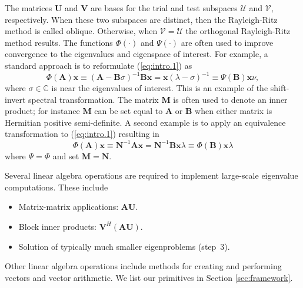 \documentclass[acmtoms]{acmtrans2m}
\begin{document}
The matrices $\mathbf{U}$ and $\mathbf{V}$ are bases for the trial
and test subspaces $\mathcal{U}$ and $\mathcal{V}$, respectively.
When these two subspaces are distinct, then the Rayleigh-Ritz method is
called oblique. Otherwise, when $\mathcal{V} = \mathcal{U}$ the
orthogonal Rayleigh-Ritz method results. The functions $\Phi(\cdot)$
and $\Psi(\cdot)$ are often used to improve convergence to the
eigenvalues and eigenspace of interest. For example, a standard
approach is to reformulate (\ref{eq:intro.1}) as
$$
  \Phi(\mathbf{A}) \mathbf{x} \equiv
  (\mathbf{A}- \mathbf{B}\sigma)^{-1}\mathbf{B}\mathbf{x} =  \mathbf{x}
  (\lambda-\sigma)^{-1} \equiv \Psi(\mathbf{B})\mathbf{x} \nu ,
$$
where $\sigma \in \mathbb{C}$ is near the eigenvalues of interest.
This is an example of the shift-invert spectral transformation. The
matrix $\mathbf{M}$ is often used to denote an inner product; for
instance $\mathbf{M}$ can be set equal to $\mathbf{A}$ or
$\mathbf{B}$ when either matrix is Hermitian positive semi-definite.
A second example is to apply an equivalence transformation to
(\ref{eq:intro.1}) resulting in
$$
   \Phi(\mathbf{A}) \mathbf{x} \equiv
   \mathbf{N}^{-1}\mathbf{A} \mathbf{x} = \mathbf{N}^{-1}\mathbf{B} \mathbf{x} \lambda
   \equiv \Phi(\mathbf{B})\mathbf{x}\lambda
$$
where $\Psi = \Phi$ and set $\mathbf{M}=\mathbf{N}$.

Several linear algebra operations are required to implement
large-scale eigenvalue computations. These include
\begin{itemize}
  \item Matrix-matrix applications: $\mathbf{A} \mathbf{U}$.
  \item Block inner products: $\mathbf{V}^H (\mathbf{A}\mathbf{U})$.
  \item Solution of typically much smaller eigenproblems (step~3).
\end{itemize}
Other linear algebra operations include methods for creating and
performing vectors and vector arithmetic. We list our primitives in
Section \ref{sec:framework}.
\end{document}
